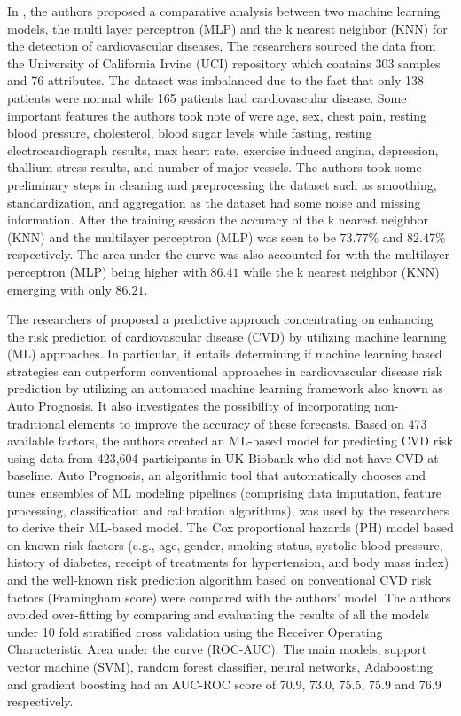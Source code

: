 \documentclass[12pt, a4paper,twoside]{report}
\numberwithin{equation}{chapter}
\begin{document}
In \cite{pal2022risk}, the authors proposed a comparative analysis between two machine learning models, the multi layer perceptron (MLP) and the k nearest neighbor (KNN) for the detection of cardiovascular diseases. The researchers sourced the data from the University of California Irvine (UCI) repository which contains 303 samples and 76 attributes. The dataset was imbalanced due to the fact that only 138 patients were normal while 165 patients had cardiovascular disease. Some important features the authors took note of were age, sex, chest pain, resting blood pressure, cholesterol, blood sugar levels while fasting, resting electrocardiograph results, max heart rate, exercise induced angina, depression, thallium stress results, and number of major vessels. The authors took some preliminary steps in cleaning and preprocessing the dataset such as smoothing, standardization, and aggregation as the dataset had some noise and missing information. After the training session the accuracy of the k nearest neighbor (KNN) and the multilayer perceptron (MLP)  was seen to be $73.77\%$ and $82.47\%$ respectively. The area under the curve was also accounted for with the multilayer perceptron (MLP) being higher with $86.41$ while the k nearest neighbor (KNN) emerging with only $86.21$.

The researchers of \cite{alaa2019cardiovascular} proposed a predictive approach concentrating on enhancing the risk prediction of cardiovascular disease (CVD) by utilizing machine learning (ML) approaches. In particular, it entails determining if machine learning based strategies can outperform conventional approaches in cardiovascular disease risk prediction by utilizing an automated machine learning framework also known as Auto Prognosis. It also investigates the possibility of incorporating non-traditional elements to improve the accuracy of these forecasts. Based on 473 available factors, the authors created an ML-based model for predicting CVD risk using data from 423,604 participants in UK Biobank who did not have CVD at baseline. Auto Prognosis, an algorithmic tool that automatically chooses and tunes ensembles of ML modeling pipelines (comprising data imputation, feature processing, classification and calibration algorithms), was used by the researchers to derive their ML-based model. The Cox proportional hazards (PH) model based on known risk factors (e.g., age, gender, smoking status, systolic blood pressure, history of diabetes, receipt of treatments for hypertension, and body mass index) and the well-known risk prediction algorithm based on conventional CVD risk factors (Framingham score) were compared with the authors' model. The authors avoided over-fitting by comparing and evaluating the results of all the models under 10 fold stratified cross validation using the Receiver Operating Characteristic Area under the curve (ROC-AUC). The main models, support vector machine (SVM), random forest classifier, neural networks, Adaboosting and gradient boosting had an AUC-ROC score of 70.9, 73.0, 75.5, 75.9 and 76.9 respectively.
\end{document}
